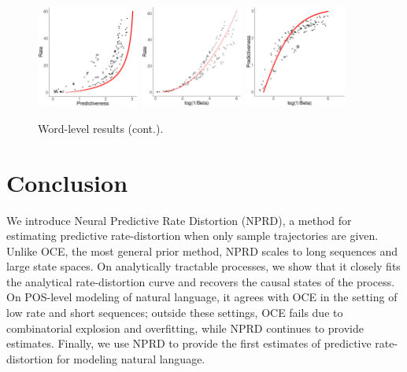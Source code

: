 \documentclass[11pt,letterpaper]{article}
\begin{document}
\begin{figure}
\begin{center}
		\includegraphics[width=0.3\textwidth]{code/figures/LDC2012T05-words-info-fitted.pdf}
\includegraphics[width=0.3\textwidth]{code/figures/LDC2012T05-words-nlogbeta-mem-fitted.pdf}
\includegraphics[width=0.3\textwidth]{code/figures/LDC2012T05-words-nlogbeta-ee-fitted.pdf}
	\end{center}
	\caption{Word-level results (cont.).}\label{fig:wordlevel-fit-2}
\end{figure}






\section{Conclusion}
We introduce Neural Predictive Rate Distortion (NPRD), a method for estimating predictive rate-distortion when only sample trajectories are given.
Unlike OCE, the most general prior method, NPRD scales to long sequences and large state spaces.
On analytically tractable processes, we show that it closely fits the analytical rate-distortion curve and recovers the causal states of the process.
On POS-level modeling of natural language, it agrees with OCE in the setting of low rate and short sequences; outside these settings, OCE fails due to combinatorial explosion and overfitting, while NPRD continues to provide estimates.
Finally, we use NPRD to provide the first estimates of predictive rate-distortion for modeling natural language.



%

\end{document}
